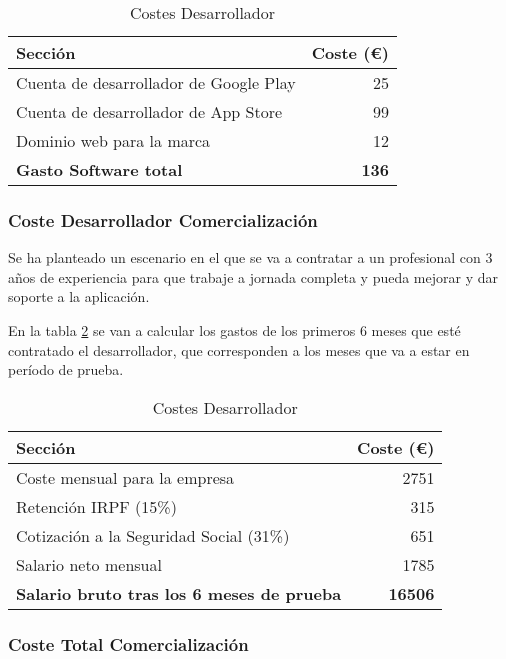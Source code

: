 \begin{table}[H]
\centering
\begin{tabular}{|l|r|}
\hline
\textbf{Sección} & \textbf{Coste (€)} \\ \hline
Cuenta de desarrollador de Google Play & 25 \\ \hline
Cuenta de desarrollador de App Store & 99  \\ \hline
Dominio web para la marca & 12 \\ \hline
\textbf{Gasto Software total} & \textbf{136} \\ \hline
\end{tabular}
\caption{Costes Desarrollador}
\label{tab:CostosSoftwareCom}
\end{table}


\subsubsection{Coste Desarrollador Comercialización}
Se ha planteado un escenario en el que se va a contratar a un profesional con 3 años de experiencia para que trabaje a jornada completa y pueda mejorar y dar soporte a la aplicación.

En la tabla \ref{tab:CostosPersonalCom} se van a calcular los gastos de los primeros 6 meses que esté contratado el desarrollador, que corresponden a los meses que va a estar en período de prueba.

\begin{table}[H]
\centering
\begin{tabular}{|l|r|}
\hline
\textbf{Sección} & \textbf{Coste (€)} \\ \hline
Coste mensual para la empresa & 2751 \\ \hline
Retención IRPF (15\%) & 315  \\ \hline
Cotización a la Seguridad Social (31\%) & 651 \\ \hline
Salario neto mensual & 1785 \\ \hline
\textbf{Salario bruto tras los 6 meses de prueba} & \textbf{16506} \\ \hline
\end{tabular}
\caption{Costes Desarrollador}
\label{tab:CostosPersonalCom}
\end{table}


\subsubsection{Coste Total Comercialización}

